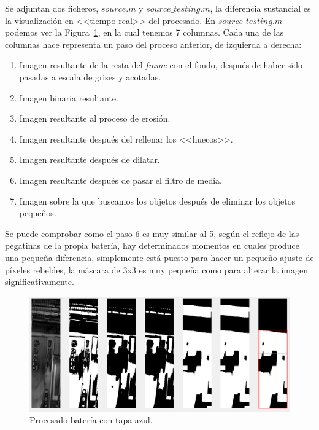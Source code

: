 \documentclass[11pt]{memoir}
\begin{document}
Se adjuntan dos ficheros, $source.m$ y $source\_testing.m$, la diferencia sustancial es la visualización en <<tiempo real>> del procesado. En $source\_testing.m$ podemos ver la Figura~\ref{fig:procesado1}, en la cual tenemos 7 columnas. Cada una de las columnas hace representa un paso del proceso anterior, de izquierda a derecha:
\begin{enumerate}
\item Imagen resultante de la resta del \textit{frame} con el fondo, después de haber sido pasadas a escala de grises y acotadas.
\item Imagen binaria resultante.
\item Imagen resultante al proceso de erosión.
\item Imagen resultante después del rellenar los <<huecos>>.
\item Imagen resultante después de dilatar.
\item Imagen resultante después de pasar el filtro de media.
\item Imagen sobre la que buscamos los objetos después de eliminar los objetos pequeños.
\end{enumerate}

Se puede comprobar como el paso 6 es muy similar al 5, según el reflejo de las pegatinas de la propia batería, hay determinados momentos en cuales produce una pequeña diferencia, simplemente está puesto para hacer un pequeño ajuste de píxeles rebeldes, la máscara de 3x3 es muy pequeña como para alterar la imagen significativamente.

\begin{center}
\begin{figure}
\includegraphics[width=\textwidth]{img/T1}
\caption{Procesado batería con tapa azul.}\label{fig:procesado1}
\end{figure}
\end{center}
\end{document}
